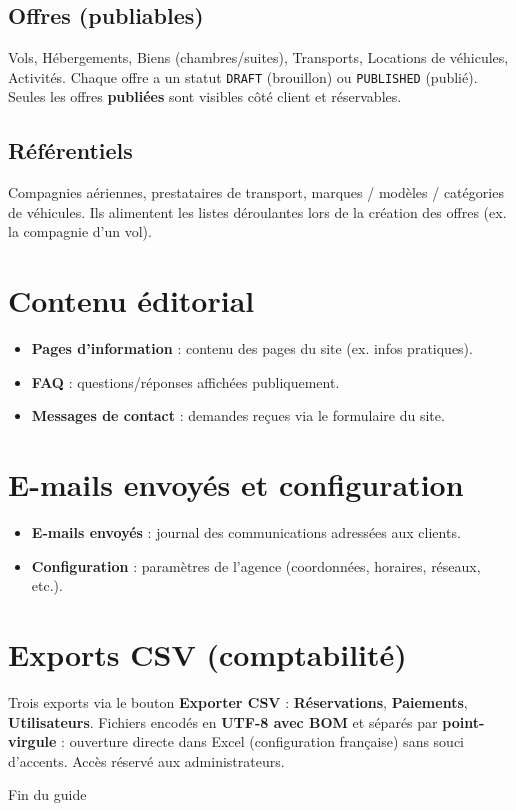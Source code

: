\documentclass[11pt,a4paper]{article}
\newcommand{\etat}[1]{\textcolor{taNavy}{\texttt{#1}}}
\begin{document}
\subsection{Offres (publiables)}
Vols, Hébergements, Biens (chambres/suites), Transports, Locations de véhicules, Activités.
Chaque offre a un statut \etat{DRAFT} (brouillon) ou \etat{PUBLISHED} (publié). Seules les offres
\textbf{publiées} sont visibles côté client et réservables.

\subsection{Référentiels}
Compagnies aériennes, prestataires de transport, marques / modèles / catégories de véhicules.
Ils alimentent les listes déroulantes lors de la création des offres (ex. la compagnie d'un vol).

\section{Contenu éditorial}
\begin{itemize}[leftmargin=1.4em]
  \item \textbf{Pages d'information} : contenu des pages du site (ex. infos pratiques).
  \item \textbf{FAQ} : questions/réponses affichées publiquement.
  \item \textbf{Messages de contact} : demandes reçues via le formulaire du site.
\end{itemize}

\section{E-mails envoyés et configuration}
\begin{itemize}[leftmargin=1.4em]
  \item \textbf{E-mails envoyés} : journal des communications adressées aux clients.
  \item \textbf{Configuration} : paramètres de l'agence (coordonnées, horaires, réseaux, etc.).
\end{itemize}

\section{Exports CSV (comptabilité)}
Trois exports via le bouton \textbf{Exporter CSV} : \textbf{Réservations}, \textbf{Paiements},
\textbf{Utilisateurs}. Fichiers encodés en \textbf{UTF-8 avec BOM} et séparés par
\textbf{point-virgule} : ouverture directe dans Excel (configuration française) sans souci
d'accents. Accès réservé aux administrateurs.

\vspace{1.2cm}
\begin{center}
\color{taStone}\small Fin du guide
\end{center}
\end{document}
